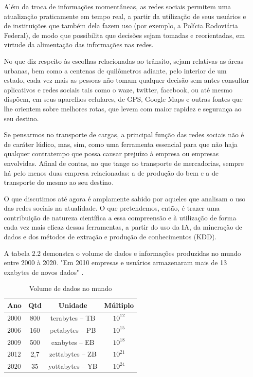 Além da troca de informações momentâneas, as redes sociais permitem uma atualização praticamente em tempo real, a partir da utilização de seus usuários e de instituições que também dela fazem uso (por exemplo, a Polícia Rodoviária Federal), de modo que possibilita que decisões sejam tomadas e reorientadas, em virtude da alimentação das informações nas redes.

No que diz respeito às escolhas relacionadas ao trânsito, sejam relativas as áreas urbanas, bem como a centenas de quilômetros adiante, pelo interior de um estado, cada vez mais as pessoas não tomam qualquer decisão sem antes consultar aplicativos e redes sociais tais como o waze, twitter, facebook, ou até mesmo dispõem, em seus aparelhos celulares, de GPS, Google Maps e outras fontes que lhe orientem sobre melhores rotas, que levem com maior rapidez e segurança ao seu destino.

Se pensarmos no transporte de cargas, a principal função das redes sociais não é de caráter lúdico, mas, sim, como uma ferramenta essencial para que não haja qualquer contratempo que possa causar prejuízo à empresa ou empresas envolvidas. Afinal de contas, no que tange ao transporte de mercadorias, sempre há pelo menos duas empresa relacionadas: a de produção do bem e a de transporte do mesmo ao seu destino.

O que discutimos até agora é amplamente sabido por aqueles que analisam o uso das redes sociais na atualidade. O que pretendemos, então, é trazer uma contribuição de natureza científica a essa compreensão e à utilização de forma cada vez mais eficaz dessas ferramentas, a partir do uso da IA, da mineração de dados e dos métodos de extração e produção de conhecimentos (KDD).


A tabela 2.2 demonstra o volume de dados e informações produzidas no mundo entre 2000 à 2020. "Em 2010 empresas e usuários armazenaram mais de 13 exabytes de novos dados" \cite{bigdataQualquerUm}.

\begin{table}[!ht]
	\centering
	\caption{Volume de dados no mundo}
	\vspace{1mm}
	\begin{tabular}{l|c|c|c}
		\hline
		\textbf{Ano} & \textbf{Qtd} & \textbf{Unidade} & \textbf{Múltiplo}\\
		\hline
		2000 & 800 & terabytes – TB & $10^{12}$\\
		2006 & 160 & petabytes – PB & $10^{15}$\\
		2009 & 500 & exabytes – EB & $10^{18}$ \\
		2012 & 2,7 & zettabytes – ZB & $10^{21}$\\
		2020 & 35 & yottabytes – YB & $10^{24}$\\
	\end{tabular}
\end{table}

